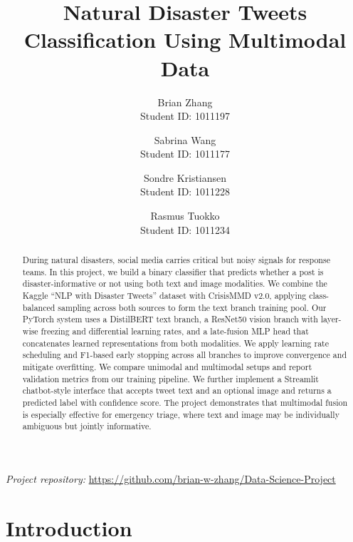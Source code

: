 \documentclass[11pt,letterpaper]{article}
\title{\vspace{-1.5cm}\LARGE\bf Natural Disaster Tweets Classification Using Multimodal Data}
\author{
    Brian Zhang \\ Student ID: 1011197 \\
    \and
    Sabrina Wang \\ Student ID: 1011177 \\
    \and
    Sondre Kristiansen \\ Student ID: 1011228 \\
    \and
    Rasmus Tuokko \\ Student ID: 1011234 \\
}
\date{}
\begin{document}
\maketitle
\begin{center}
    \small\textit{Project repository:} \url{https://github.com/brian-w-zhang/Data-Science-Project}
\end{center}

\begin{abstract}
During natural disasters, social media carries critical but noisy signals for response teams. In this project, we build a binary classifier that predicts whether a post is disaster-informative or not using both text and image modalities. We combine the Kaggle ``NLP with Disaster Tweets'' dataset with CrisisMMD v2.0, applying class-balanced sampling across both sources to form the text branch training pool. Our PyTorch system uses a DistilBERT text branch, a ResNet50 vision branch with layer-wise freezing and differential learning rates, and a late-fusion MLP head that concatenates learned representations from both modalities. We apply learning rate scheduling and F1-based early stopping across all branches to improve convergence and mitigate overfitting. We compare unimodal and multimodal setups and report validation metrics from our training pipeline. We further implement a Streamlit chatbot-style interface that accepts tweet text and an optional image and returns a predicted label with confidence score. The project demonstrates that multimodal fusion is especially effective for emergency triage, where text and image may be individually ambiguous but jointly informative.
\end{abstract}

\section{Introduction}
\end{document}
